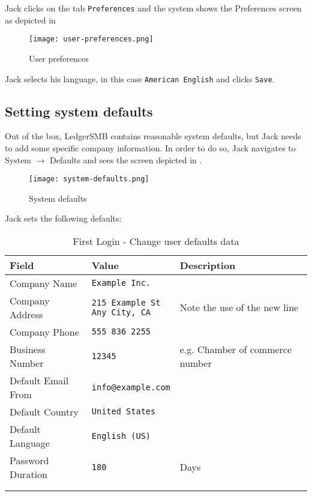 Jack clicks on the tab \texttt{Preferences} and the system shows the Preferences screen 
as depicted in 

\begin{figure}[H]
	\centering
	\texttt{[image: user-preferences.png]}
	\caption{User preferences}
	\label{fig:first-user-preferences}
\end{figure}

Jack selects his language, in this case \texttt{American English} and clicks \texttt{Save}.

\subsection{Setting system defaults}
\label{subsec-setting-system-defaults}

Out of the box, LedgerSMB contains reasonable system defaults, but Jack needs to add some specific company information.
In order to do so, Jack navigates to System $\rightarrow$ Defaults and sees the screen depicted in .
 
\begin{figure}[H]
	\centering
	\texttt{[image: system-defaults.png]}
	\caption{System defaults}
	\label{fig:first-user-system-defaults}
\end{figure}

Jack sets the following defaults:
\begin{longtable}{ llp{6cm} }
	Field & Value & Description \\ \hline
	\endhead
	Company Name & \texttt{Example Inc.} & \\
	Company Address &  \makecell[l]{\texttt{215 Example St} \\  \texttt{Any City, CA}} & Note the use of the new line\\
	Company Phone &  \texttt{555 836 2255} & \\
	Business Number &  \texttt{12345} & e.g. Chamber of commerce number\\
	Default Email From & \texttt{info@example.com} & \\
	Default Country & \texttt{United States}  & \\
	Default Language &  \texttt{English (US)} & \\
	Password Duration &  \texttt{180} & Days\\
	\\
\caption{First Login - Change user defaults data}
\label{fig:first-user-user-default-data}
\end{longtable}

